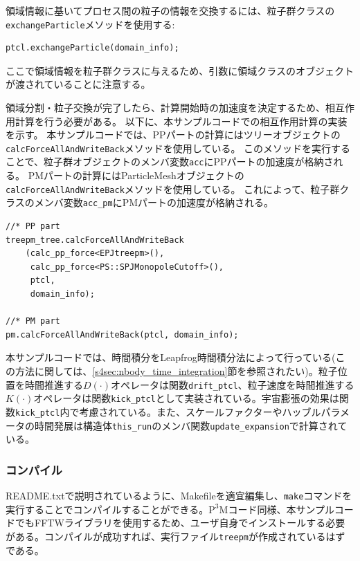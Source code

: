 領域情報に基いてプロセス間の粒子の情報を交換するには、粒子群クラスの\texttt{exchangeParticle}メソッドを使用する:
\begin{lstlisting}[caption=粒子交換の実行]
ptcl.exchangeParticle(domain_info);
\end{lstlisting}
ここで領域情報を粒子群クラスに与えるため、引数に領域クラスのオブジェクトが渡されていることに注意する。

領域分割・粒子交換が完了したら、計算開始時の加速度を決定するため、相互作用計算を行う必要がある。
以下に、本サンプルコードでの相互作用計算の実装を示す。
本サンプルコードでは、PPパートの計算にはツリーオブジェクトの\texttt{calcForceAllAndWriteBack}メソッドを使用している。
このメソッドを実行することで、粒子群オブジェクトのメンバ変数\texttt{acc}にPPパートの加速度が格納される。
PMパートの計算にはParticleMeshオブジェクトの\texttt{calcForceAllAndWriteBack}メソッドを使用している。
これによって、粒子群クラスのメンバ変数\texttt{acc\_pm}にPMパートの加速度が格納される。

\begin{lstlisting}[caption=相互作業計算の実行]
//* PP part
treepm_tree.calcForceAllAndWriteBack
    (calc_pp_force<EPJtreepm>(),
     calc_pp_force<PS::SPJMonopoleCutoff>(),
     ptcl,
     domain_info);
 
//* PM part
pm.calcForceAllAndWriteBack(ptcl, domain_info); 
\end{lstlisting}

本サンプルコードでは、時間積分をLeapfrog時間積分法によって行っている(この方法に関しては、\ref{s4sec:nbody_time_integration}節を参照されたい)。粒子位置を時間推進する$D(\cdot)$オペレータは関数\texttt{drift\_ptcl}、粒子速度を時間推進する$K(\cdot)$オペレータは関数\texttt{kick\_ptcl}として実装されている。宇宙膨張の効果は関数\texttt{kick\_ptcl}内で考慮されている。また、スケールファクターやハッブルパラメータの時間発展は構造体\texttt{this\_run}のメンバ関数\texttt{update\_expansion}で計算されている。

\subsubsection{コンパイル}
README.txtで説明されているように、Makefileを適宜編集し、\texttt{make}コマンドを実行することでコンパイルすることができる。$\mathrm{P^{3}M}$コード同様、本サンプルコードでもFFTWライブラリを使用するため、ユーザ自身でインストールする必要がある。コンパイルが成功すれば、実行ファイル\texttt{treepm}が作成されているはずである。

